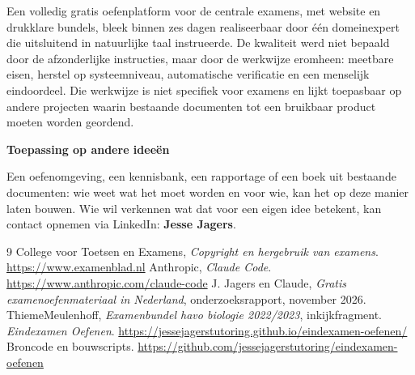 \documentclass[10.5pt,a4paper]{article}
\begin{document}
Een volledig gratis oefenplatform voor de centrale examens, met website en drukklare bundels, bleek binnen zes dagen
realiseerbaar door één domeinexpert die uitsluitend in natuurlijke taal instrueerde. De kwaliteit werd niet bepaald door de
afzonderlijke instructies, maar door de werkwijze eromheen: meetbare eisen, herstel op systeemniveau, automatische
verificatie en een menselijk eindoordeel. Die werkwijze is niet specifiek voor examens en lijkt toepasbaar op andere
projecten waarin bestaande documenten tot een bruikbaar product moeten worden geordend.

\begin{tcolorbox}[enhanced,colback=donker,colframe=donker,arc=0pt,left=14pt,right=14pt,top=10pt,bottom=10pt,fontupper=\color{white}\small,before skip=12pt]
{\sffamily\bfseries\large Toepassing op andere ideeën}\par\smallskip
Een oefenomgeving, een kennisbank, een rapportage of een boek uit bestaande documenten: wie weet wat het moet worden en voor
wie, kan het op deze manier laten bouwen. Wie wil verkennen wat dat voor een eigen idee betekent, kan contact opnemen via
LinkedIn: \textbf{Jesse Jagers}.
\end{tcolorbox}

\renewcommand\refname{Bronnen}
\begin{thebibliography}{9}\small\setlength\itemsep{1pt}
 College voor Toetsen en Examens, \emph{Copyright en hergebruik van examens}. \url{https://www.examenblad.nl}
 Anthropic, \emph{Claude Code}. \url{https://www.anthropic.com/claude-code}
 J. Jagers en Claude, \emph{Gratis examenoefenmateriaal in Nederland}, onderzoeksrapport, november 2026.
 ThiemeMeulenhoff, \emph{Examenbundel havo biologie 2022/2023}, inkijkfragment.
 \emph{Eindexamen Oefenen}. \url{https://jessejagerstutoring.github.io/eindexamen-oefenen/}
 Broncode en bouwscripts. \url{https://github.com/jessejagerstutoring/eindexamen-oefenen}
\end{thebibliography}
\end{document}
